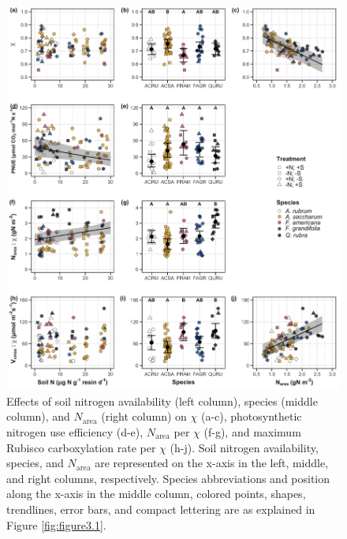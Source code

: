 \newpage
\begin{figure}
    \includegraphics[width=\textwidth]{ch3_NxpH/figs/NxS_fig4_pnueiwue.jpg}
    \centering
    \caption[Effects of soil nitrogen availability, species, and leaf nitrogen content on tradeoffs between nitrogen and water use]{Effects of soil nitrogen availability (left column), species (middle column), and $N_\mathrm{area}$ (right column) on $\chi$ (a-c), photosynthetic nitrogen use efficiency (d-e), $N_\mathrm{area}$ per $\chi$ (f-g), and maximum Rubisco carboxylation rate per $\chi$ (h-j). Soil nitrogen availability, species, and $N_\mathrm{area}$ are represented on the x-axis in the left, middle, and right columns, respectively. Species abbreviations and position along the x-axis in the middle column, colored points, shapes, trendlines, error bars, and compact lettering are as explained in Figure \ref{fig:figure3.1}.}
    \label{fig:figure3.4}
\end{figure}
\clearpage

